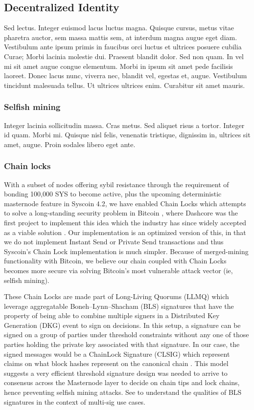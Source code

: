 \documentclass[peerreview]{ieeesyscoin}
\begin{document}
\subsection{Decentralized Identity}
Sed lectus. Integer euismod lacus luctus magna. Quisque cursus, metus vitae pharetra auctor, sem massa mattis sem, at interdum magna augue eget diam. Vestibulum ante ipsum primis in faucibus orci luctus et ultrices posuere cubilia Curae; Morbi lacinia molestie dui. Praesent blandit dolor. Sed non quam. In vel mi sit amet augue congue elementum. Morbi in ipsum sit amet pede facilisis laoreet. Donec lacus nunc, viverra nec, blandit vel, egestas et, augue. Vestibulum tincidunt malesuada tellus. Ut ultrices ultrices enim. Curabitur sit amet mauris. 

\subsubsection{Selfish mining}

Integer lacinia sollicitudin massa. Cras metus. Sed aliquet risus a tortor. Integer id quam. Morbi mi. Quisque nisl felis, venenatis tristique, dignissim in, ultrices sit amet, augue. Proin sodales libero eget ante.

\subsubsection{Chain locks}

With a subset of nodes offering sybil resistance through the requirement of bonding 100,000 SYS to become active, plus the upcoming deterministic masternode feature in Syscoin 4.2, we have enabled Chain Locks which attempts to solve a long-standing security problem in Bitcoin \cite{Eya18}, where Dashcore was the first project to implement this idea \cite{Blo18} which the industry has since widely accepted as a viable solution \cite{Val19}. Our implementation is an optimized version of this, in that we do not implement Instant Send or Private Send transactions and thus Syscoin’s Chain Lock implementation is much simpler. Because of merged-mining functionality with Bitcoin, we believe our chain coupled with Chain Locks becomes more secure via solving Bitcoin’s most vulnerable attack vector (ie, selfish mining). 

These Chain Locks are made part of Long-Living Quorums (LLMQ) which leverage aggregatable Boneh–Lynn–Shacham (BLS) signatures that have the property of being able to combine multiple signers in a Distributed Key Generation (DKG) event to sign on decisions. In this setup, a signature can be signed on a group of parties under threshold constraints without any one of those parties holding the private key associated with that signature. In our case, the signed messages would be a ChainLock Signature (CLSIG) which represent claims on what block hashes represent on the canonical chain \cite{Blo18}. This model suggests a very efficient   threshold signature design was needed to arrive to consensus across the Masternode layer to decide on chain tips and lock chains, hence preventing selfish mining attacks. See \cite{Bon18} to understand the qualities of BLS signatures in the context of multi-sig use cases.
\end{document}

